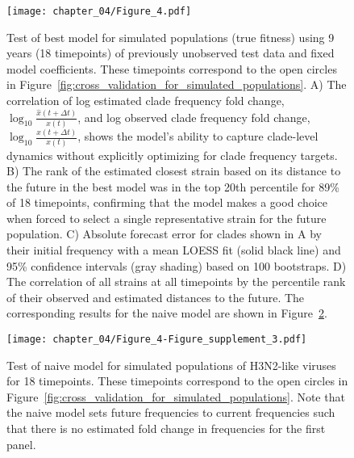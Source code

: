 \begin{figure}
  \texttt{[image: chapter\_04/Figure\_4.pdf]}
  \caption{
  Test of best model for simulated populations (true fitness) using 9 years (18 timepoints) of previously unobserved test data and fixed model coefficients.
  These timepoints correspond to the open circles in Figure~\ref{fig:cross_validation_for_simulated_populations}.
  A) The correlation of log estimated clade frequency fold change, $\log_{10}{\frac{\hat{x}(t + \Delta{t})}{x(t)}}$, and log observed clade frequency fold change, $\log_{10}{\frac{x(t + \Delta{t})}{x(t)}}$, shows the model's ability to capture clade-level dynamics without explicitly optimizing for clade frequency targets.
  B) The rank of the estimated closest strain based on its distance to the future in the best model was in the top 20th percentile for 89\% of 18 timepoints, confirming that the model makes a good choice when forced to select a single representative strain for the future population.
  C) Absolute forecast error for clades shown in A by their initial frequency with a mean LOESS fit (solid black line) and 95\% confidence intervals (gray shading) based on 100 bootstraps.
  D) The correlation of all strains at all timepoints by the percentile rank of their observed and estimated distances to the future.
  The corresponding results for the naive model are shown in Figure~\ref{fig:test_of_naive_model_for_simulated_populations}.
  }
  \label{fig:test_of_best_model_for_simulated_populations}
\end{figure}

\begin{figure}
  \texttt{[image: chapter\_04/Figure\_4-Figure\_supplement\_3.pdf]}
  \caption{
    Test of naive model for simulated populations of H3N2-like viruses for 18 timepoints.
    These timepoints correspond to the open circles in Figure~\ref{fig:cross_validation_for_simulated_populations}.
    Note that the naive model sets future frequencies to current frequencies such that there is no estimated fold change in frequencies for the first panel.
  }
  \label{fig:test_of_naive_model_for_simulated_populations}
\end{figure}

